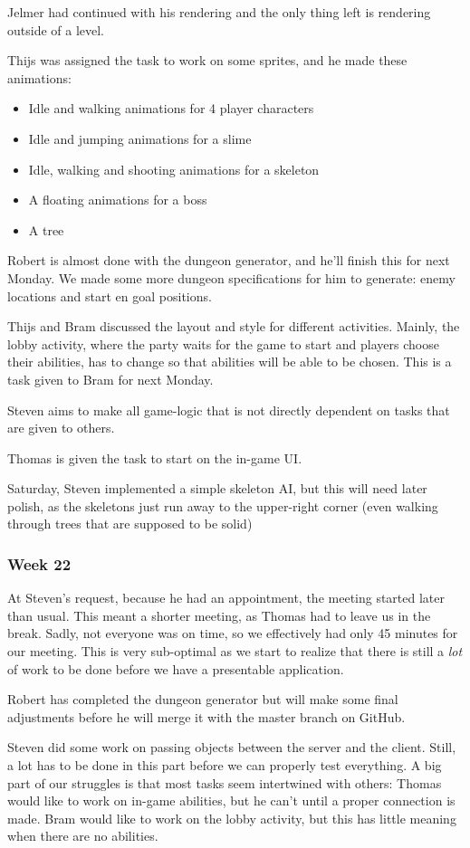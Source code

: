 \documentclass[../main.tex]{subfiles}
\begin{document}
Jelmer had continued with his rendering and the only thing left is rendering outside of a level. 

Thijs was assigned the task to work on some sprites, and he made these animations:
\begin{itemize}
	\item Idle and walking animations for 4 player characters
	\item Idle and jumping animations for a slime
	\item Idle, walking and shooting animations for a skeleton
	\item A floating animations for a boss
	\item A tree
\end{itemize}
Robert is almost done with the dungeon generator, and he'll finish this for next Monday. We made some more dungeon specifications for him to generate: enemy locations and start en goal positions.

Thijs and Bram discussed the layout and style for different activities. Mainly, the lobby activity, where the party waits for the game to start and players choose their abilities, has to change so that abilities will be able to be chosen. This is a task given to Bram for next Monday. 

Steven aims to make all game-logic that is not directly dependent on tasks that are given to others. 

Thomas is given the task to start on the in-game UI. 

Saturday, Steven implemented a simple skeleton AI, but this will need later polish, as the skeletons just run away to the upper-right corner (even walking through trees that are supposed to be solid)


\subsubsection*{Week 22}
At Steven's request, because he had an appointment, the meeting started later than usual. This meant a shorter meeting, as Thomas had to leave us in the break. Sadly, not everyone was on time, so we effectively had only 45 minutes for our meeting. This is very sub-optimal as we start to realize that there is still a \textit{lot} of work to be done before we have a presentable application.

Robert has completed the dungeon generator but will make some final adjustments before he will merge it with the master branch on GitHub. 

Steven did some work on passing objects between the server and the client. Still, a lot has to be done in this part before we can properly test everything. A big part of our struggles is that most tasks seem intertwined with others: Thomas would like to work on in-game abilities, but he can't until a proper connection is made. Bram would like to work on the lobby activity, but this has little meaning when there are no abilities.
\end{document}
